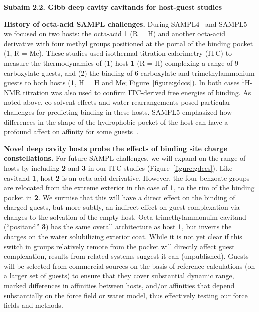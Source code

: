 \documentclass[11pt]{article}
\begin{document}
{\bf Subaim 2.2. Gibb deep cavity cavitands for host-guest studies} 


{\bf History of octa-acid SAMPL challenges.} During SAMPL4~\cite{gibb_binding_2013} and SAMPL5~\cite{sullivan_binding_2016} we focused on two hosts: the octa-acid 1 (R = H) and another octa-acid derivative with four methyl groups positioned at the portal of the binding pocket (1, R = Me). 
These studies used isothermal titration calorimetry (ITC) to measure the thermodynamics of (1) host {\bf 1} (R = H) complexing a range of 9 carboxylate guests,
and (2) the binding of 6 carboxylate and trimethylammonium guests to both hosts ({\bf 1}, H = H and Me; Figure~\ref{figure:gdccs}).  
In both cases $^1$H-NMR titration was also used to confirm ITC-derived free energies of binding.  
As noted above, co-solvent effects and water rearrangements posed particular challenges for predicting binding in these hosts. 
SAMPL5 emphasized how differences in the shape of the hydrophobic pocket of the host can have a profound affect on affinity for some guests~\cite{yin_overview_2016}.


{\bf Novel deep cavity hosts probe the effects of binding site charge constellations.} 
For future SAMPL challenges, we will expand on the range of hosts by including {\bf 2} and {\bf 3} in our ITC studies (Figure~\ref{figure:gdccs}).  
Like cavitand {\bf 1}, host {\bf 2} is an octa-acid derivative.  However, the four benzoate groups are relocated from the extreme exterior in the case of {\bf 1}, to the rim of the binding pocket in {\bf 2}.  
We surmise that this will have a direct effect on the binding of charged guests, but more subtly, an indirect effect on guest complexation via changes to the solvation of the empty host.  
Octa-trimethylammonuim cavitand (``positand'' {\bf 3}) has the same overall architecture as host {\bf 1}, but inverts the charges on the water solubilizing exterior coat.  
While it is not yet clear if this switch in groups relatively remote from the pocket will directly affect guest complexation, results from related systems suggest it can (unpublished). 
Guests will be selected from commercial sources on the basis of reference calculations (on a larger set of guests) to ensure that they cover substantial dynamic range, marked differences in affinities between hosts, and/or affinities that depend substantially on the force field or water model, thus effectively testing our force fields and methods.
\end{document}
